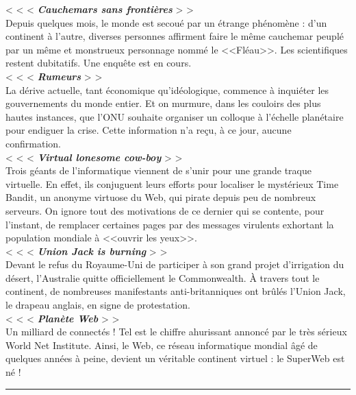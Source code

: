 \documentclass[11pt,twoside,a4paper]{book}
\begin{document}
< < <  \textbf{\textit{Cauchemars sans fronti{\`e}res}} > >~\\
Depuis quelques mois, le monde est secou{\'e} par un {\'e}trange ph{\'e}nom{\`e}ne : d'un continent {\`a} l'autre, diverses personnes affirment faire le m{\^e}me cauchemar peupl{\'e} par un m{\^e}me et monstrueux personnage nomm{\'e} le <<Fl{\'e}au>>. Les scientifiques restent dubitatifs. Une enqu{\^e}te est en cours.~\\
< < <  \textbf{\textit{Rumeurs}} > >~\\
La d{\'e}rive actuelle, tant {\'e}conomique qu'id{\'e}ologique, commence {\`a} inqui{\'e}ter les gouvernements du monde entier. Et on murmure, dans les couloirs des plus hautes instances, que l'ONU souhaite organiser un colloque {\`a} l'{\'e}chelle plan{\'e}taire pour endiguer la crise. Cette information n'a re\c{c}u, {\`a} ce jour, aucune confirmation.~\\
< < <  \textbf{\textit{Virtual lonesome cow-boy}} > >~\\
Trois g{\'e}ants de l'informatique viennent de s'unir pour une grande traque virtuelle. En effet, ils conjuguent leurs efforts pour localiser le myst{\'e}rieux Time Bandit, un anonyme virtuose du Web, qui pirate depuis peu de nombreux serveurs. On ignore tout des motivations de ce dernier qui se contente, pour l'instant, de remplacer certaines pages par des messages virulents exhortant la population mondiale {\`a} <<ouvrir les yeux>>.~\\
< < <  \textbf{\textit{Union Jack is burning}} > >~\\
Devant le refus du Royaume-Uni de participer {\`a} son grand projet d'irrigation du d{\'e}sert, l'Australie quitte officiellement le Commonwealth. {\`A} travers tout le continent, de nombreuses manifestants anti-britanniques ont br{\^u}l{\'e}s l'Union Jack, le drapeau anglais, en signe de protestation.~\\
< < <  \textbf{\textit{Plan{\`e}te Web}} > >~\\
Un milliard de connect{\'e}s ! Tel est le chiffre ahurissant annonc{\'e} par le tr{\`e}s s{\'e}rieux World Net Institute. Ainsi, le Web, ce r{\'e}seau informatique mondial {\^a}g{\'e} de quelques ann{\'e}es {\`a} peine, devient un v{\'e}ritable continent virtuel : le SuperWeb est n{\'e} !~\\

\hrule

\clearpage

\end{document}
